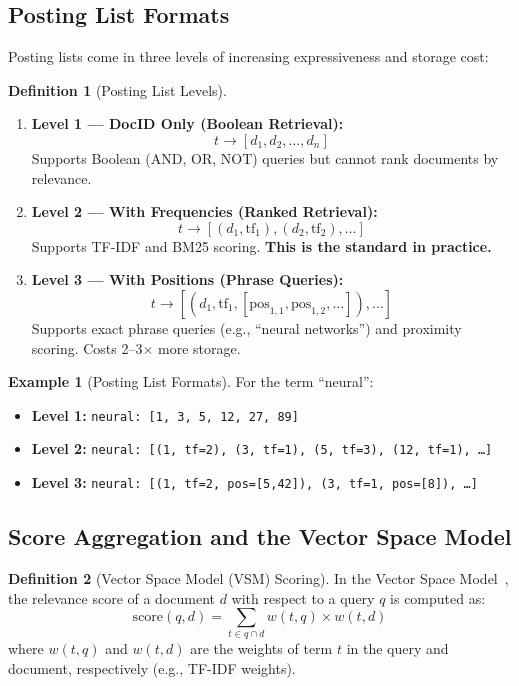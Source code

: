 \documentclass[aspectratio=169]{beamer} \usetheme{TUDelft} %
\theoremstyle{definition}
\newtheorem{definition}{Definition}[section]
\newtheorem{example}{Example}[section]
\theoremstyle{plain}
\begin{document}
\subsection{Posting List Formats}

Posting lists come in three levels of increasing expressiveness and storage cost:

\begin{definition}[Posting List Levels]
\label{def:posting-levels}
~
\begin{enumerate}
    \item \textbf{Level 1 --- DocID Only (Boolean Retrieval):}
    \[
    t \to [d_1, d_2, \ldots, d_n]
    \]
    Supports Boolean (AND, OR, NOT) queries but cannot rank documents by relevance.
    
    \item \textbf{Level 2 --- With Frequencies (Ranked Retrieval):}
    \[
    t \to [(d_1, \mathrm{tf}_1), (d_2, \mathrm{tf}_2), \ldots]
    \]
    Supports TF-IDF and BM25 scoring. \textbf{This is the standard in practice.}
    
    \item \textbf{Level 3 --- With Positions (Phrase Queries):}
    \[
    t \to [(d_1, \mathrm{tf}_1, [\mathrm{pos}_{1,1}, \mathrm{pos}_{1,2}, \ldots]), \ldots]
    \]
    Supports exact phrase queries (e.g., ``neural networks'') and proximity scoring. Costs 2--3$\times$ more storage.
\end{enumerate}
\end{definition}

\begin{example}[Posting List Formats]
For the term ``neural'':
\begin{itemize}
    \item \textbf{Level 1:} \texttt{neural: [1, 3, 5, 12, 27, 89]}
    \item \textbf{Level 2:} \texttt{neural: [(1, tf=2), (3, tf=1), (5, tf=3), (12, tf=1), \ldots]}
    \item \textbf{Level 3:} \texttt{neural: [(1, tf=2, pos=[5,42]), (3, tf=1, pos=[8]), \ldots]}
\end{itemize}
\end{example}


\subsection{Score Aggregation and the Vector Space Model}

\begin{definition}[Vector Space Model (VSM) Scoring]
\label{def:vsm-scoring}
In the Vector Space Model~\cite{salton1975vector}, the relevance score of a document $d$ with respect to a query $q$ is computed as:
\begin{equation}
\mathrm{score}(q, d) = \sum_{t \in q \cap d} w(t, q) \times w(t, d)
\label{eq:vsm}
\end{equation}
where $w(t, q)$ and $w(t, d)$ are the weights of term $t$ in the query and document, respectively (e.g., TF-IDF weights).
\end{definition}
\end{document}
